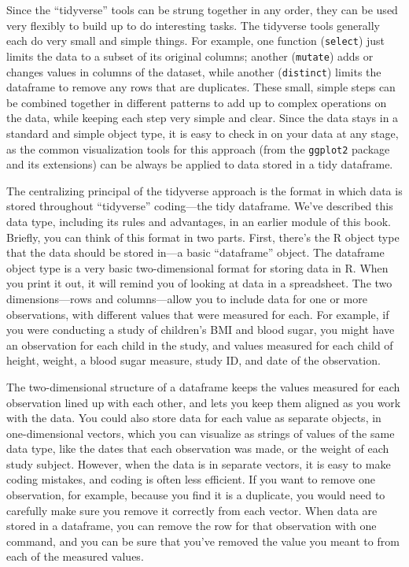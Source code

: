 \documentclass[]{tufte-book}
\begin{document}
Since the ``tidyverse'' tools can be strung together in any order, they can be
used very flexibly to build up to do interesting tasks. The tidyverse tools
generally each do very small and simple things. For example, one function
(\texttt{select}) just limits the data to a subset of its original columns; another
(\texttt{mutate}) adds or changes values in columns of the dataset, while another
(\texttt{distinct}) limits the dataframe to remove any rows that are duplicates. These
small, simple steps can be combined together in different patterns to add up to
complex operations on the data, while keeping each step very simple and clear.
Since the data stays in a standard and simple object type, it is easy to check
in on your data at any stage, as the common visualization tools for this
approach (from the \texttt{ggplot2} package and its extensions) can be always be
applied to data stored in a tidy dataframe.

The centralizing principal of the tidyverse approach is the format in which data
is stored throughout ``tidyverse'' coding---the tidy dataframe. We've described
this data type, including its rules and advantages, in an earlier module of this
book. Briefly, you can think of this format in two parts. First, there's the R
object type that the data should be stored in---a basic ``dataframe'' object. The
dataframe object type is a very basic two-dimensional format for storing data in
R. When you print it out, it will remind you of looking at data in a
spreadsheet. The two dimensions---rows and columns---allow you to include data
for one or more observations, with different values that were measured for each.
For example, if you were conducting a study of children's BMI and blood sugar,
you might have an observation for each child in the study, and values measured
for each child of height, weight, a blood sugar measure, study ID, and date of
the observation.

The two-dimensional structure of a dataframe keeps the values
measured for each observation lined up with each other, and lets you keep them
aligned as you work with the data. You could also store data for each value as
separate objects, in one-dimensional vectors, which you can visualize as strings
of values of the same data type, like the dates that each observation was made,
or the weight of each study subject. However, when the data is in separate
vectors, it is easy to make coding mistakes, and coding is often less efficient.
If you want to remove one observation, for example, because you find it is a
duplicate, you would need to carefully make sure you remove it correctly from
each vector. When data are stored in a dataframe, you can remove the row for
that observation with one command, and you can be sure that you've removed the
value you meant to from each of the measured values.
\end{document}
